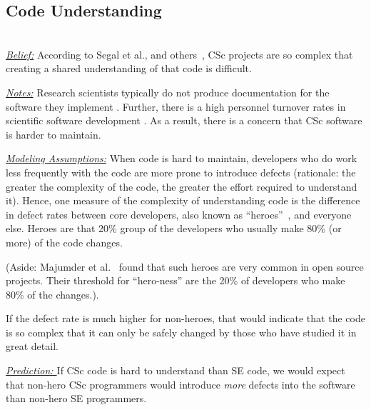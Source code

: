 \documentclass[conference,10pt]{IEEEtran}
\begin{document}




  
 
\subsection{Code Understanding} ~\\
\noindent \textit{\underline{Belief:}} According to
Segal et al., and others~\cite{segal07_problem, carver06_hpc, Shull05_parallel, sanders08_risk},
CSc projects are so complex that creating
a shared understanding of that code is difficult. 


\noindent \textit{\underline{Notes:}} Research scientists typically do not produce documentation for the software they implement \cite{segal07_enduser, sanders08_risk}.
Further, there is a high personnel turnover rates in scientific software development \cite{carver06_hpc, segal07_problem}. As a result, there is a concern that CSc software is harder to maintain. 

\noindent \textit{\underline{Modeling Assumptions:}} 
When code is hard to maintain,
developers who do work less frequently with the code are more prone to introduce defects
(rationale: the greater the complexity of the code, the greater the effort required to understand it).
Hence, one measure of the complexity of understanding code
is the difference in defect rates between core developers, also known as ``heroes''~\cite{agrawal2018we, goeminne2011evidence, torres2011analysis, robles2009evolution}, and everyone else.
Heroes are that  20\% group of the developers who usually make 80\% (or more) of the code changes.

(Aside:   Majumder et al.~\cite{majumder19_heroes} found that such heroes are very common in open source projects. Their threshold for ``hero-ness'' are the 20\% of developers
who make 80\% of the changes.).

If the defect rate is much higher for non-heroes, that would
indicate that the code is so complex that it can only
be safely changed by those who have studied it in great detail.


\noindent \textit{\underline{Prediction: }} If CSc code is hard to understand than SE code, we would expect that non-hero CSc programmers would
introduce {\em more} defects into the software than non-hero SE programmers. 
\end{document}
